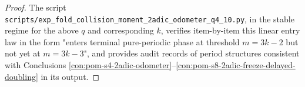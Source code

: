 \begin{proof}
The script \texttt{scripts/exp\_fold\_collision\_moment\_2adic\_odometer\_q4\_10.py}, in the stable regime for the above \(q\) and corresponding \(k\),
verifies item-by-item this linear entry law in the form "enters terminal pure-periodic phase at threshold \(m=3k-2\) but not yet at \(m=3k-3\)", and provides audit records of period structures consistent with Conclusions \ref{con:pom-s4-2adic-odometer}--\ref{con:pom-s8-2adic-freeze-delayed-doubling} in its output.
\end{proof}










